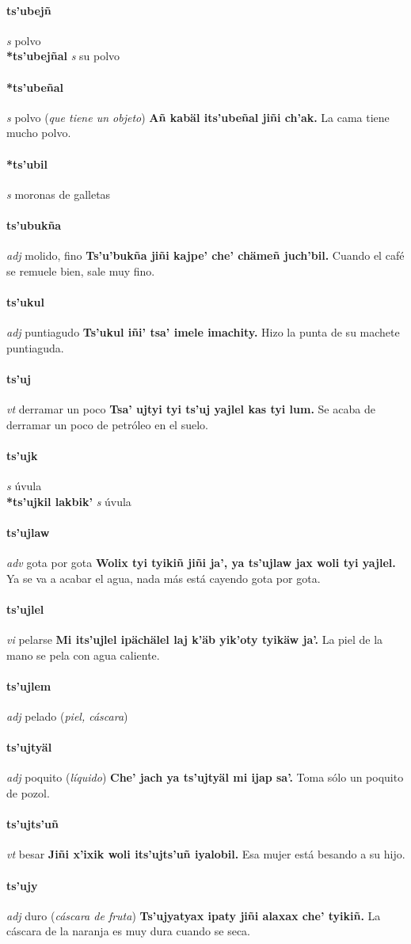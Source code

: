 \documentclass{scrbook}
\newcommand{\entry}[1]{\paragraph{#1}}
\newcommand{\partofspeech}[1]{\textit{#1}}
\newcommand{\spanishtranslation}[1]{#1}
\newcommand{\clarification}[1]{(\textit{#1})}
\newcommand{\cholexample}[1]{\textbf{#1}}
\newcommand{\exampletranslation}[1]{#1}
\newcommand{\secondaryentry}[1]{\\\textbf{#1}}
\newcommand{\secondpartofspeech}[1]{\textit{#1}}
\newcommand{\secondtranslation}[1]{#1}
\begin{document}
\begin{multicols}{2}
\entry{ts'ubejñ}
\partofspeech{s}
\spanishtranslation{polvo}
\secondaryentry{*ts'ubejñal}
\secondpartofspeech{s}
\secondtranslation{su polvo}

\entry{*ts'ubeñal}
\partofspeech{s}
\spanishtranslation{polvo}
\clarification{que tiene un objeto}
\cholexample{Añ kabäl its'ubeñal jiñi ch'ak.}
\exampletranslation{La cama tiene mucho polvo.}

\entry{*ts'ubil}
\partofspeech{s}
\spanishtranslation{moronas de galletas}

\entry{ts'ubukña}
\partofspeech{adj}
\spanishtranslation{molido, fino}
\cholexample{Ts'u'bukña jiñi kajpe' che' chämeñ juch'bil.}
\exampletranslation{Cuando el café se remuele bien, sale muy fino.}

\entry{ts'ukul}
\partofspeech{adj}
\spanishtranslation{puntiagudo}
\cholexample{Ts'ukul iñi' tsa' imele imachity.}
\exampletranslation{Hizo la punta de su machete puntiaguda.}

\entry{ts'uj}
\partofspeech{vt}
\spanishtranslation{derramar un poco}
\cholexample{Tsa' ujtyi tyi ts'uj yajlel kas tyi lum.}
\exampletranslation{Se acaba de derramar un poco de petróleo en el suelo.}

\entry{ts'ujk}
\partofspeech{s}
\spanishtranslation{úvula}
\secondaryentry{*ts'ujkil lakbik'}
\secondpartofspeech{s}
\secondtranslation{úvula}

\entry{ts'ujlaw}
\partofspeech{adv}
\spanishtranslation{gota por gota}
\cholexample{Wolix tyi tyikiñ jiñi ja', ya ts'ujlaw jax woli tyi yajlel.}
\exampletranslation{Ya se va a acabar el agua, nada más está cayendo gota por gota.}

\entry{ts'ujlel}
\partofspeech{vi}
\spanishtranslation{pelarse}
\cholexample{Mi its'ujlel ipächälel laj k'äb yik'oty tyikäw ja'.}
\exampletranslation{La piel de la mano se pela con agua caliente.}

\entry{ts'ujlem}
\partofspeech{adj}
\spanishtranslation{pelado}
\clarification{piel, cáscara}

\entry{ts'ujtyäl}
\partofspeech{adj}
\spanishtranslation{poquito}
\clarification{líquido}
\cholexample{Che' jach ya ts'ujtyäl mi ijap sa'.}
\exampletranslation{Toma sólo un poquito de pozol.}

\entry{ts'ujts'uñ}
\partofspeech{vt}
\spanishtranslation{besar}
\cholexample{Jiñi x'ixik woli its'ujts'uñ iyalobil.}
\exampletranslation{Esa mujer está besando a su hijo.}

\entry{ts'ujy}
\partofspeech{adj}
\spanishtranslation{duro}
\clarification{cáscara de fruta}
\cholexample{Ts'ujyatyax ipaty jiñi alaxax che' tyikiñ.}
\exampletranslation{La cáscara de la naranja es muy dura cuando se seca.}


\end{multicols}
\end{document}

